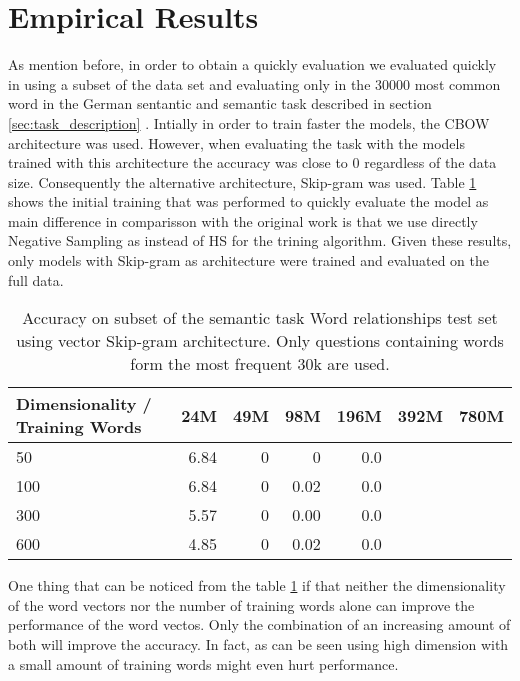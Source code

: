 \section{Empirical Results}
\label{sec:sub_empirical_results}

As mention before, in order to obtain a quickly evaluation we evaluated
quickly in using a subset of the data set and  evaluating only in the 30000
most common word in the German sentantic and semantic task described in
section \ref{sec:task_description} . Intially in order to train faster the
models, the \ac{CBOW} architecture was used. However,  when evaluating the task
with the models trained with this architecture the  accuracy was close to 0
regardless of the data size. Consequently the alternative architecture,
Skip-gram was used.  Table  \ref{tab:initial_w2v_training}  shows the initial
training that was performed to quickly evaluate the model as main difference
in comparisson with the original work is that we use directly Negative
Sampling as instead of \ac{HS} for the trining algorithm.  Given these  results, only models with Skip-gram as architecture were
trained and evaluated on the full data. 

\begin{table}[h]
\centering
\caption{Accuracy on subset of the semantic task Word relationships test set using
vector Skip-gram architecture. Only questions containing words form the most
 frequent 30k are used.} 
\label{tab:initial_w2v_training}



\small
\begin{tabular}{|l|r|r|r|r|l|l|}
\hline
 Dimensionality / Training Words  &   24M  &  49M  &   98M  &  196M  &  392M  &  780M  \\
\hline
                              50  &  6.84  &    0  &     0  &   0.0  &        &        \\
                             100  &  6.84  &    0  &  0.02  &   0.0  &        &        \\
                             300  &  5.57  &    0  &  0.00  &   0.0  &        &        \\
                             600  &  4.85  &    0  &  0.02  &   0.0  &        &        \\
\end{tabular}
\end{table}

One thing that can be noticed from the table \ref{tab:initial_w2v_training}
if that neither the dimensionality of the word vectors nor the number of
training words alone can improve the performance of the word vectos. Only the
combination of an increasing amount of both will improve the accuracy. In
fact, as can be seen using high dimension with a small amount of training
words might even hurt performance.

